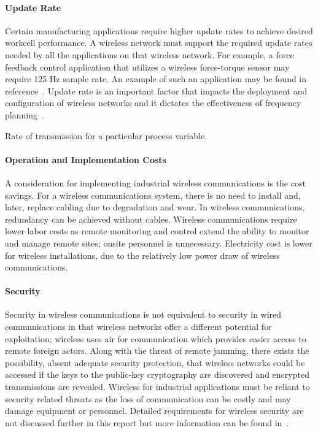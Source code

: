 \paragraph{Update Rate}
Certain manufacturing applications require higher update rates to achieve desired workcell performance. A wireless network must support the required update rates needed by all the applications on that wireless network. For example, a force feedback control application that utilizes a wireless force-torque sensor may require 125 Hz sample rate. An example of such an application may be found in reference~\cite{Candell_ISIT_2019}. Update rate is an important factor that impacts the deployment and configuration of wireless networks and it dictates the effectiveness of frequency planning~\cite{Candell2018.IWSGuide}.
\begin{definition} \label{def:updaterate}
	Rate of transmission for a particular process variable.
\end{definition}

\paragraph{Operation and Implementation Costs}
A consideration for implementing industrial wireless communications is the cost savings. For a wireless communications system, there is no need to install and, later, replace cabling due to degradation and wear. In wireless communications, redundancy can be achieved without cables. Wireless communications require lower labor costs as remote monitoring and control extend the ability to monitor and manage remote sites; onsite personnel is unnecessary. Electricity cost is lower for wireless installations, due to the relatively low power draw of wireless communications.

\paragraph{Security}
Security in wireless communications is not equivalent to security in wired communications in that wireless networks offer a different potential for exploitation; wireless uses air for communication which provides easier access to remote foreign actors. Along with the threat of remote jamming, there exists the possibility, absent adequate security protection, that wireless networks could be accessed if the keys to the public-key cryptography are discovered and encrypted transmissions are revealed. Wireless for industrial applications must be reliant to security related threats as the loss of communication can be costly and may damage equipment or personnel. Detailed requirements for wireless security are not discussed further in this report but more information can be found in~\cite{Stouffer2015}.

